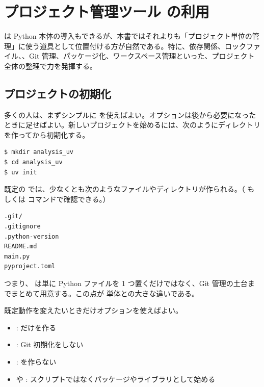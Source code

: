 \section{プロジェクト管理ツール  の利用}

 は Python 本体の導入もできるが、本書ではそれよりも「プロジェクト単位の管理」に使う道具として位置付ける方が自然である。特に、依存関係、ロックファイル、、Git 管理、パッケージ化、ワークスペース管理といった、プロジェクト全体の整理で力を発揮する。

\subsection{プロジェクトの初期化}

多くの人は、まずシンプルに  を使えばよい。オプションは後から必要になったときに足せばよい。新しいプロジェクトを始めるには、次のようにディレクトリを作ってから初期化する。

\begin{lstlisting}[numbers=none, xleftmargin=2\zw]
$ mkdir analysis_uv
$ cd analysis_uv
$ uv init
\end{lstlisting}

既定の  では、少なくとも次のようなファイルやディレクトリが作られる。（ もしくは  コマンドで確認できる。）

\begin{lstlisting}[numbers=none, xleftmargin=2\zw, title={analysis\_uv/ の初期構成}]
.git/
.gitignore
.python-version
README.md
main.py
pyproject.toml
\end{lstlisting}

つまり、 は単に Python ファイルを 1 つ置くだけではなく、Git 管理の土台までまとめて用意する。この点が  単体との大きな違いである。



既定動作を変えたいときだけオプションを使えばよい。

\begin{itemize}
\item {}:  だけを作る
\item {}: Git 初期化をしない
\item {}:  を作らない
\item {} や : スクリプトではなくパッケージやライブラリとして始める
\end{itemize}

